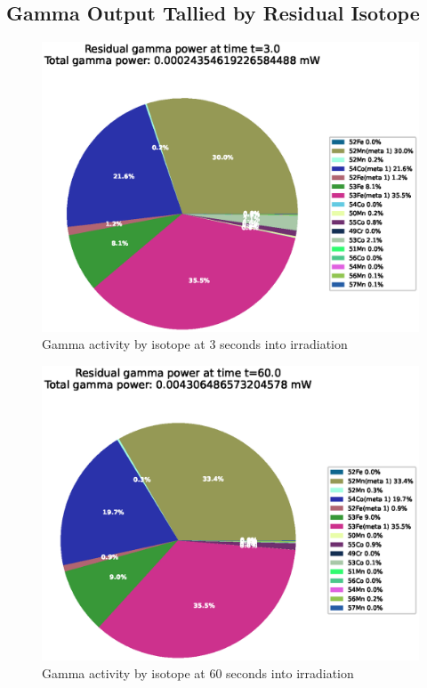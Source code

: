 \subsection{Gamma Output Tallied by Residual Isotope}

\FloatBarrier


\begin{figure}[!htb]
\centering
\includegraphics[width=0.8\linewidth]{chapters/activity_code/fe-activity-v2/residual-energy/0001_3.eps}
\caption{Gamma activity by isotope at 3 seconds into irradiation}
\label{fig:activity-v2-residual-power-3s}
\end{figure}

\begin{figure}[!htb]
\centering
\includegraphics[width=0.8\linewidth]{chapters/activity_code/fe-activity-v2/residual-energy/0020_60.eps}
\caption{Gamma activity by isotope at 60 seconds into irradiation}
\label{fig:activity-v2-residual-power-60s}
\end{figure}

